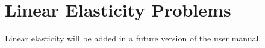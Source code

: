%
%


\section{Linear Elasticity Problems}
\label{sec:elasticity}


Linear elasticity will be added in a future version of the user manual.

